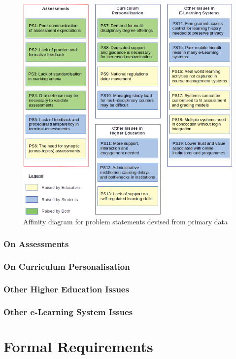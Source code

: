 \begin{figure}[!ht] 
    \centering    
    \includegraphics[width=1.0\textwidth]{ps-affinity}
    \caption[Affinity diagram for primary data]
        {Affinity diagram for problem statements devised from primary data}
    \label{fig:ps-affinity}
\end{figure}

\subsubsection{On Assessments}

\subsubsection{On Curriculum Personalisation}

\subsubsection{Other Higher Education Issues}

\subsubsection{Other e-Learning System Issues}

\clearpage
\section{Formal Requirements}

